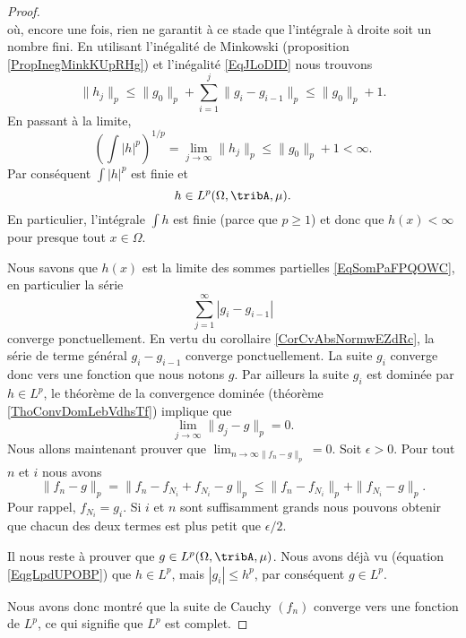 \begin{proof}
\begin{equation}
    \end{equation}
    où, encore une fois, rien ne garantit à ce stade que l'intégrale à droite soit un nombre fini. En utilisant l'inégalité de Minkowski (proposition \ref{PropInegMinkKUpRHg}) et l'inégalité \eqref{EqJLoDID} nous trouvons
    \begin{equation}
        \|h_j\|_p\leq \|g_0\|_p+\sum_{i=1}^j\|g_i-g_{i-1}\|_p\leq \|g_0\|_p+1.
    \end{equation}
    En passant à la limite,
    \begin{equation}
        \left( \int| h |^p \right)^{1/p}=\lim_{j\to \infty}\|h_j\|_p \leq \|g_0\|_p+1<\infty.
    \end{equation}
    Par conséquent \( \int| h |^p\) est finie et
    \begin{equation}    \label{EqgLpdUPOBP}
        h\in L^p(\Omega,\tribA,\mu).
    \end{equation}
    En particulier, l'intégrale \( \int h\) est finie (parce que \( p\geq 1\)) et donc que \( h(x)<\infty\) pour presque tout \( x\in\Omega\).

    Nous savons que \( h(x)\) est la limite des sommes partielles \eqref{EqSomPaFPQOWC}, en particulier la série
    \begin{equation}
        \sum_{j=1}^{\infty}| g_i-g_{i-1} |
    \end{equation}
    converge ponctuellement. En vertu du corollaire \ref{CorCvAbsNormwEZdRc}, la série de terme général \( g_i-g_{i-1}\) converge ponctuellement. La suite \( g_i\) converge donc vers une fonction que nous notons \( g\). Par ailleurs la suite \( g_i\) est dominée par \( h\in L^p\), le théorème de la convergence dominée (théorème \ref{ThoConvDomLebVdhsTf}) implique que
    \begin{equation}
        \lim_{j\to \infty} \|g_j-g\|_p=0.
    \end{equation}
    Nous allons maintenant prouver que \( \lim_{n\to \infty\|f_n-g\|_p} =0\). Soit \( \epsilon>0\). Pour tout \( n\) et \( i\) nous avons
    \begin{equation}
        \|f_n-g\|_p=\|f_n-f_{N_i}+f_{N_i}-g\|_p\leq\|f_n-f_{N_i}\|_p+\|f_{N_i}-g\|_p.
    \end{equation}
    Pour rappel, \( f_{N_i}=g_i\). Si \(i\) et \( n\) sont suffisamment grands nous pouvons obtenir que chacun des deux termes est plus petit que \( \epsilon/2\).

    Il nous reste à prouver que \( g\in L^p(\Omega,\tribA,\mu)\). Nous avons déjà vu (équation \eqref{EqgLpdUPOBP}) que \( h\in L^p\), mais \( | g_i |\leq h^p\), par conséquent  \( g\in L^p\).

    Nous avons donc montré que la suite de Cauchy \( (f_n)\) converge vers une fonction de \( L^p\), ce qui signifie que \( L^p\) est complet.
\end{proof}

